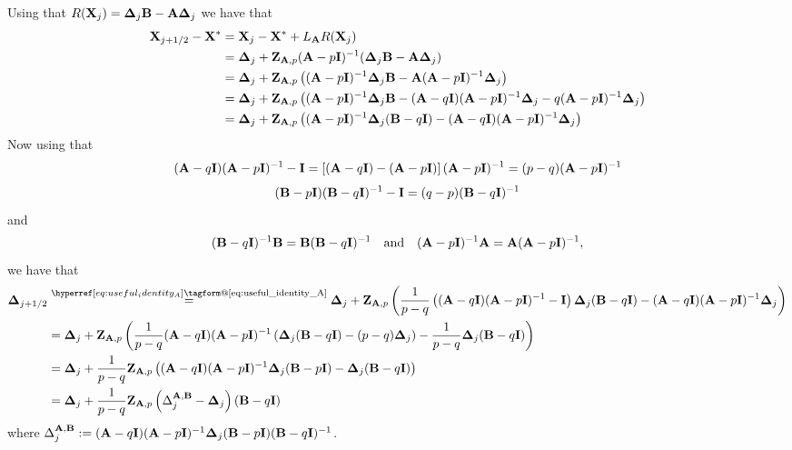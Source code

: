 \documentclass[10pt]{article}
\makeatletter
\renewcommand*{\eqref}[1]{%
  \hyperref[{#1}]{\textup{\tagform@{\ref*{#1}}}}%
}
\theoremstyle{definition}
\makeatother
\begin{document}
Using that $ R({\bf X}_j) = {\bf \Delta}_j{\bf B}  -{\bf A} {\bf \Delta}_j$ we have that
\begin{align*}
 {\bf X}_{j+1/2} -{\bf X}^*&= {\bf X}_{j}-{\bf X}^* +L_{{\bf A}} R({\bf X}_{j})    \\
 & = {\bf \Delta}_j +{\bf Z}_{{\bf A},p}({\bf A}-p{\bf I})^{-1} ({\bf \Delta}_j{\bf B}  -{\bf A} {\bf \Delta}_j)\\
& =  {\bf \Delta}_j +{\bf Z}_{{\bf A},p}\left(({\bf A}-p{\bf I})^{-1} {\bf \Delta}_j{\bf B}  -{\bf A} ({\bf A}-p{\bf I})^{-1}{\bf \Delta}_j \right) \\
& = {\bf \Delta}_j +{\bf Z}_{{\bf A},p}\left(({\bf A}-p{\bf I})^{-1} {\bf \Delta}_j{\bf B}  -({\bf A}-q{\bf I}) ({\bf A}-p{\bf I})^{-1}{\bf \Delta}_j  -q ({\bf A}-p{\bf I})^{-1}{\bf \Delta}_j \right)  \\
&= {\bf \Delta}_j +{\bf Z}_{{\bf A},p}\left(({\bf A}-p{\bf I})^{-1} {\bf \Delta}_j({\bf B}-q{\bf I})  -({\bf A}-q{\bf I}) ({\bf A}-p{\bf I})^{-1}{\bf \Delta}_j  \right)
\end{align*}
Now using that
\begin{equation}
    \label{eq:useful_identity_A}
    ({\bf A} - q {\bf I}) ({\bf A} - p {\bf I})^{-1} - {\bf I} = \left[({\bf A} - q {\bf I}) - ({\bf A} - p {\bf I})\right] ({\bf A} - p {\bf I})^{-1} = (p-q) ({\bf A} - p {\bf I})^{-1}
\end{equation}
\begin{equation}
    \label{eq:useful_identity_B}
    ({\bf B} - p {\bf I}) ({\bf B} - q {\bf I})^{-1} - {\bf I} = (q-p) ({\bf B} - q {\bf I})^{-1}
\end{equation}
and
\[ ({\bf B}-q{\bf I})^{-1}{\bf B} = {\bf B} ({\bf B}-q{\bf I})^{-1} \quad \mbox{and} \quad ({\bf A}-p{\bf I})^{-1}{\bf A} = {\bf A} ({\bf A}-p{\bf I})^{-1},\]
we have that
\begin{align}
 \mDelta_{j+1/2}
&\overset{\eqref{eq:useful_identity_A}}{=} \mDelta_j +\mZ_{\mA,p}\left(\frac{1}{p-q}\left(  (\mA - q \mI) (\mA - p \mI)^{-1} - \mI \right) \mDelta_j(\mB-q\mI)  -(\mA-q\mI) (\mA-p\mI)^{-1}\mDelta_j  \right) \nonumber \\
&= \mDelta_j +\mZ_{\mA,p}\left(\frac{1}{p-q} (\mA - q \mI) (\mA - p \mI)^{-1} \left(\mDelta_j(\mB-q\mI)  -(p-q)\mDelta_j\right)  -\frac{1}{p-q}\mDelta_j(\mB-q\mI) \right) \nonumber\\
&= \mDelta_j +\frac{1}{p-q}\mZ_{\mA,p}\left( (\mA - q \mI) (\mA - p \mI)^{-1} \mDelta_j(\mB-p\mI)    -\mDelta_j(\mB-q\mI) \right)\nonumber \\
&=  \mDelta_j +\frac{1}{p-q}\mZ_{\mA,p}\left( \Delta_j^{\mA,\mB}    -\mDelta_j \right) (\mB-q\mI)\label{eq:deltajhalfdev}
\end{align}
where  $\Delta_j^{{\bf A},{\bf B}}  := ({\bf A} - q {\bf I}) ({\bf A} - p {\bf I})^{-1} {\bf \Delta}_j({\bf B}-p{\bf I})({\bf B}-q{\bf I})^{-1} $.
\end{document}

